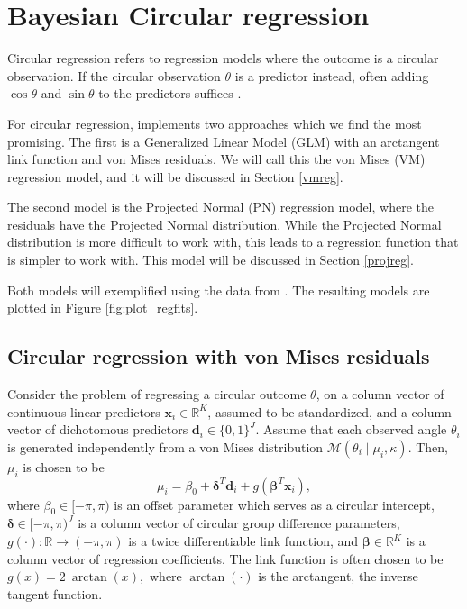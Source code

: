 \hypertarget{bayesian-circular-regression}{%
\section{Bayesian Circular
regression}\label{bayesian-circular-regression}}

\label{circreg}

Circular regression refers to regression models where the outcome is a
circular observation. If the circular observation \(\theta\) is a
predictor instead, often adding \(\cos\theta\) and \(\sin\theta\) to the
predictors suffices \citep{fisher1995statistical}.

For circular regression,  implements two approaches which
we find the most promising. The first is a Generalized Linear Model
(GLM) with an arctangent link function and von Mises residuals. We will
call this the von Mises (VM) regression model, and it will be discussed
in Section \ref{vmreg}.

The second model is the Projected Normal (PN) regression model, where
the residuals have the Projected Normal distribution. While the
Projected Normal distribution is more difficult to work with, this leads
to a regression function that is simpler to work with. This model will
be discussed in Section \ref{projreg}.

Both models will exemplified using the  data
\citep{puglisi2017role} from . The resulting models are
plotted in Figure \ref{fig:plot_regfits}.

\hypertarget{circular-regression-with-von-mises-residuals}{%
\subsection{Circular regression with von Mises
residuals}\label{circular-regression-with-von-mises-residuals}}

\label{vmreg}

Consider the problem of regressing a circular outcome \(\theta\), on a
column vector of continuous linear predictors
\(\boldsymbol{x}_i \in \mathbb{R}^K\), assumed to be standardized, and a
column vector of dichotomous predictors
\(\boldsymbol{d}_i \in \{0, 1\}^J\). Assume that each observed angle
\(\theta_i\) is generated independently from a von Mises distribution
\(\mathcal{M}(\theta_i \mid \mu_i, \kappa)\). Then, \(\mu_i\) is chosen
to be \begin{equation}
\mu_i = \beta_0 + \boldsymbol{\delta}^T \boldsymbol{d}_i + g(\boldsymbol{\beta}^T \boldsymbol{x}_i),
\end{equation} where \(\beta_0 \in [-\pi, \pi)\) is an offset parameter
which serves as a circular intercept,
\(\boldsymbol{\delta}\in [-\pi, \pi)^J\) is a column vector of circular
group difference parameters,
\(g(\cdot) : \mathbb{R} \rightarrow (-\pi, \pi)\) is a twice
differentiable link function, and \(\boldsymbol{\beta}\in \mathbb{R}^K\)
is a column vector of regression coefficients. The link function is
often chosen to be \(g(x) = 2 ~ \arctan(x),\) where \(\arctan(\cdot)\)
is the arctangent, the inverse tangent function.

